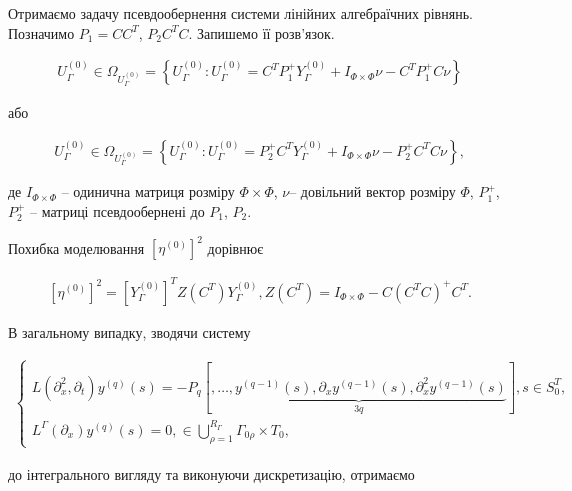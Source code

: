 Отримаємо задачу псевдообернення системи лінійних алгебраїчних рівнянь.
Позначимо $P_{1}=CC^{T}$, $P_{2}C^{T}C$.
Запишемо її розв'язок.

\begin{gather*}
U^{(0)}_{\Gamma}\in\Omega_{U^{(0)}_{\Gamma}}=
    \left\{ U^{(0)}_{\Gamma}:U^{(0)}_{\Gamma}=C^{T}P^{+}_{1}Y^{(0)}_{\Gamma}+I_{\Phi\times\Phi}\nu-C^{T}P^{+}_{1}C\nu \right\}
\end{gather*}

або

\begin{gather*}
    U^{(0)}_{\Gamma}\in\Omega_{U^{(0)}_{\Gamma}}=
    \left\{ U^{(0)}_{\Gamma}:U^{(0)}_{\Gamma}=P^{+}_{2}C^{T}Y^{(0)}_{\Gamma}+I_{\Phi\times\Phi}\nu-P^{+}_{2}C^{T}C\nu \right\},
\end{gather*}

де $I_{\Phi\times\Phi}$ -- одинична матриця розміру $\Phi\times\Phi$, $\nu$-- довільний вектор розміру $\Phi$,
$P^{+}_{1}$, $P^{+}_{2}$ -- матриці псевдообернені до $P_{1}$, $P_{2}$.

Похибка моделювання $\left[ \eta^{(0)} \right]^{2}$ дорівнює

\begin{gather*}
    \left[ \eta^{(0)} \right]^{2}=\left[ Y^{(0)}_{\Gamma} \right]^T Z\left( C^{T} \right)Y^{(0)}_{\Gamma},
    Z(C^{T})=I_{\Phi\times\Phi}-C\left( C^{T}C \right)^{+}C^{T}.
\end{gather*}

В загальному випадку, зводячи систему

\begin{gather*}
    \left\{
    \begin{alignedat}{2}
    L(\partial^{2}_{x}, \partial_{t})y^{(q)}(s)=-P_{q}
    \left[
        \underbrace{
            ,\dots,
            y^{(q-1)}(s), \partial_x y^{(q-1)}(s), \partial_x^2 y^{(q-1)}(s)
        }_{3q}
        \right],
    s\in S^{T}_{0}, \\
    L^{\Gamma}(\partial_{x})y^{(q)}(s)=0, \in\bigcup\limits_{\rho=1}^{R_{\Gamma}} \Gamma_{0\rho}\times T_{0},
    \end{alignedat}
    \right.
\end{gather*}

до інтегрального вигляду та виконуючи дискретизацію, отримаємо

